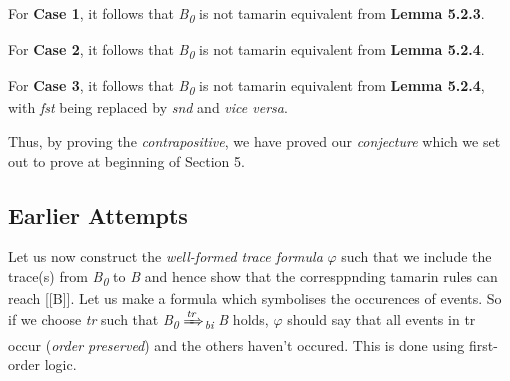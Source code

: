 \documentclass[11pt]{article}
\begin{document}
For {\bf Case 1}, it follows that {\it B\textsubscript{0}} is not tamarin equivalent from {\bf Lemma 5.2.3}.\newline

For {\bf Case 2}, it follows that {\it B\textsubscript{0}} is not tamarin equivalent from {\bf Lemma 5.2.4}.\newline

For {\bf Case 3}, it follows that {\it B\textsubscript{0}} is not tamarin equivalent from {\bf Lemma 5.2.4}, with {\it fst} being replaced by {\it snd} and {\it vice versa}.\newline

Thus, by proving the {\it contrapositive}, we have proved our {\it conjecture} which we set out to prove at beginning of Section 5.

\pagebreak
\vspace{8pt}
\subsection{Earlier Attempts}
Let us now construct the {\it well-formed trace formula} $\varphi$ such that we include the trace(s) from {\it B\textsubscript{0}} to {\it B} and hence show that the corresppnding tamarin rules can reach [[B]]. Let us make a formula which symbolises the occurences of events. So if we choose {\it tr} such that {\it B\textsubscript{0}} {$\xRightarrow[\text{}]{\text{{\it tr}}}$}\textsubscript{{\it bi}} {\it B} holds, $\varphi$ should say that all events in tr occur ({\it order preserved}) and the others haven't occured. This is done using first-order logic.\\
\end{document}
